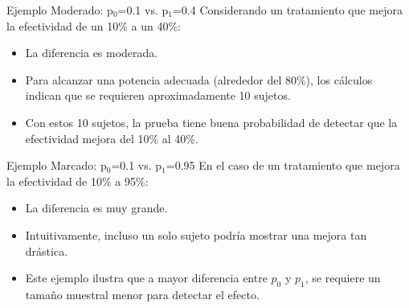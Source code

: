 ﻿\documentclass{beamer}
\begin{document}
\begin{frame}{Ejemplo Moderado: p$_0$=0.1 vs. p$_1$=0.4}
Considerando un tratamiento que mejora la efectividad de un 10\% a un 40\%:
\begin{itemize}
    \item La diferencia es moderada.
    \item Para alcanzar una potencia adecuada (alrededor del 80\%), los cálculos indican que se requieren aproximadamente 10 sujetos.
    \item Con estos 10 sujetos, la prueba tiene buena probabilidad de detectar que la efectividad mejora del 10\% al 40\%.
\end{itemize}
\end{frame}

\begin{frame}{Ejemplo Marcado: p$_0$=0.1 vs. p$_1$=0.95}
En el caso de un tratamiento que mejora la efectividad de 10\% a 95\%:
\begin{itemize}
    \item La diferencia es muy grande.
    \item Intuitivamente, incluso un solo sujeto podría mostrar una mejora tan drástica.
    \item Este ejemplo ilustra que a mayor diferencia entre $p_0$ y $p_1$, se requiere un tamaño muestral menor para detectar el efecto.
\end{itemize}
\end{frame}
\end{document}
